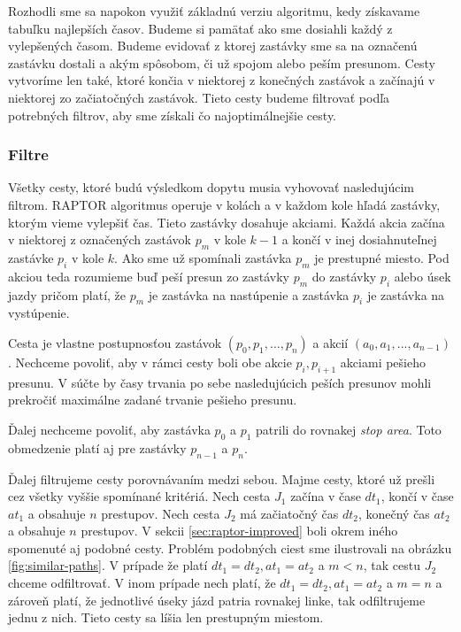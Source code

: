 Rozhodli sme sa napokon využiť základnú verziu algoritmu, kedy získavame tabuľku najlepších časov. Budeme si pamätať ako sme dosiahli každý z vylepšených časom. Budeme evidovať z ktorej zastávky sme sa na označenú zastávku dostali a akým spôsobom, či už spojom alebo peším presunom. Cesty vytvoríme len také, ktoré končia v niektorej z konečných zastávok a začínajú v niektorej zo začiatočných zastávok. Tieto cesty budeme filtrovať podľa potrebných filtrov, aby sme získali čo najoptimálnejšie cesty. 

\subsubsection{Filtre}
Všetky cesty, ktoré budú výsledkom dopytu musia vyhovovať nasledujúcim filtrom. RAPTOR algoritmus operuje v kolách a v každom kole hľadá zastávky, ktorým vieme vylepšiť čas. Tieto zastávky dosahuje akciami. Každá akcia začína v niektorej z označených zastávok $p_m$ v kole $k-1$ a končí v inej dosiahnuteľnej zastávke $p_i$ v kole $k$.  Ako sme už spomínali zastávka $p_m$ je prestupné miesto. Pod akciou teda rozumieme buď peší presun zo zastávky $p_m$ do zastávky $p_i$ alebo úsek jazdy pričom platí, že $p_m$ je zastávka na nastúpenie a zastávka $p_i$ je zastávka na vystúpenie.

Cesta je vlastne postupnosťou zastávok $(p_0, p_1, …, p_n)$ a akcií $(a_0, a_1, ..., a_{n-1})$. Nechceme povoliť, aby v rámci cesty boli obe akcie $p_i, p_{i+1}$ akciami pešieho presunu. V súčte by časy trvania po sebe nasledujúcich peších presunov mohli prekročiť maximálne zadané trvanie pešieho presunu. 

Ďalej nechceme povoliť, aby zastávka $p_0$ a $p_1$ patrili do rovnakej \textit{stop area}. Toto obmedzenie platí aj pre zastávky $p_{n-1}$ a $p_n$.

Ďalej filtrujeme cesty porovnávaním medzi sebou. Majme cesty, ktoré už prešli cez všetky vyššie spomínané kritériá. Nech cesta $J_1$ začína v čase $dt_1$, končí v čase $at_1$ a obsahuje $n$ prestupov. Nech cesta $J_2$ má začiatočný čas $dt_2$, konečný čas $at_2$ a obsahuje $n$ prestupov. V sekcii \ref{sec:raptor-improved} boli okrem iného spomenuté aj podobné cesty. Problém podobných ciest sme ilustrovali na obrázku \ref{fig:similar-paths}. V prípade že platí $dt_1 = dt_2, at_1=at_2$ a $m < n$, tak cestu $J_2$ chceme odfiltrovať. V inom prípade nech platí, že $dt_1 = dt_2, at_1=at_2$ a $m=n$ a zároveň platí, že jednotlivé úseky jázd patria rovnakej linke, tak odfiltrujeme jednu z nich. Tieto cesty sa líšia len prestupným miestom. 

